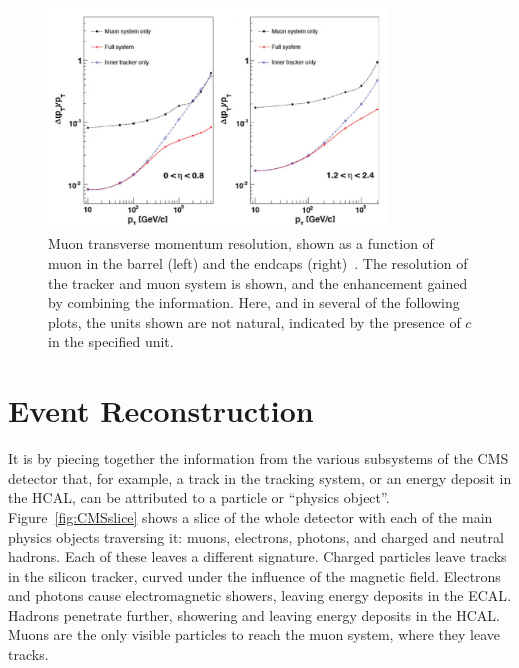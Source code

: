 \begin{figure}[htbp]
  \begin{center}
  \includegraphics[width=0.8\textwidth]{Figures/detector/CMSmuonRes}
  \caption{Muon transverse momentum resolution, shown as a function of muon \pt in the barrel (left) and the endcaps (right)~\cite{Chatrchyan:2008zzk}. The resolution of the tracker and muon system is shown, and the enhancement gained by combining the information. 
  Here, and in several of the following plots, the units shown are not natural, indicated by the presence of $c$ in the specified unit.
}
  \label{fig:CMSmuonRes}
  \end{center}
\end{figure}

%                                                                  

\newpage
\section{Event Reconstruction} \label{sec:CMSreco}

It is by piecing together the information from the various subsystems of the \ac{CMS} detector that, for example, a track in the tracking system, or an energy deposit in the \ac{HCAL}, can be attributed to a particle or ``physics object''. 
Figure~\ref{fig:CMSslice} shows a slice of the whole detector with each of the main physics objects traversing it: muons, electrons, photons, and charged and neutral hadrons.
Each of these leaves a different signature.
Charged particles leave tracks in the silicon tracker, curved under the influence of the magnetic field.
Electrons and photons cause electromagnetic showers, leaving energy deposits in the \ac{ECAL}.
Hadrons penetrate further, showering and leaving energy deposits in the \ac{HCAL}. 
Muons are the only visible particles to reach the muon system, where they leave tracks.

